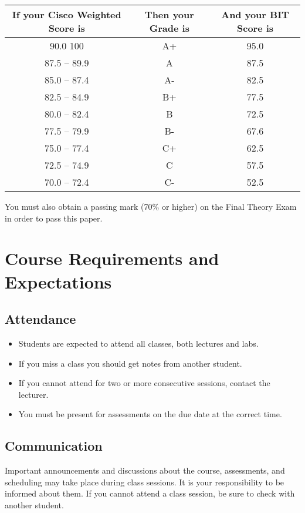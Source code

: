 \documentclass{article}
\begin{document}
\begin{tabular}{|c|c|c|}
\hline
If your Cisco Weighted Score is &	Then your Grade is	& And your BIT Score is \\ \hline
90.0   100	                    &   A+	                & 95.0 \\ \hline
87.5 – 89.9	                    &   A	                & 87.5 \\ \hline
85.0 – 87.4	                    &   A-	                & 82.5 \\ \hline
82.5 – 84.9	                    &   B+	                & 77.5 \\ \hline
80.0 – 82.4	                    &   B	                & 72.5 \\ \hline
77.5 – 79.9	                    &   B-	                & 67.6 \\ \hline
75.0 – 77.4	                    &   C+	                & 62.5 \\ \hline
72.5 – 74.9	                    &   C                   & 57.5 \\ \hline
70.0 – 72.4	                    &   C-	                & 52.5 \\ \hline
\end{tabular}
\vspace{3mm}

You must also obtain a passing mark (70\% or higher) on the Final Theory Exam in order to pass this paper.

\section*{Course Requirements and Expectations}
\subsection*{Attendance}
\begin{itemize}
 \item Students are expected to attend all classes, both lectures and labs.
 \item If you miss a class you should get notes from another student.
 \item If you cannot attend for two or more consecutive sessions, contact the lecturer.
 \item You must be present for assessments on the due date at the correct time.
\end{itemize}

\subsection*{Communication}
Important announcements and discussions about the course, assessments, and scheduling may take place during class sessions.  It is your responsibility to be informed about them.  If you cannot attend a class session, be sure to check with another student.
\end{document}
